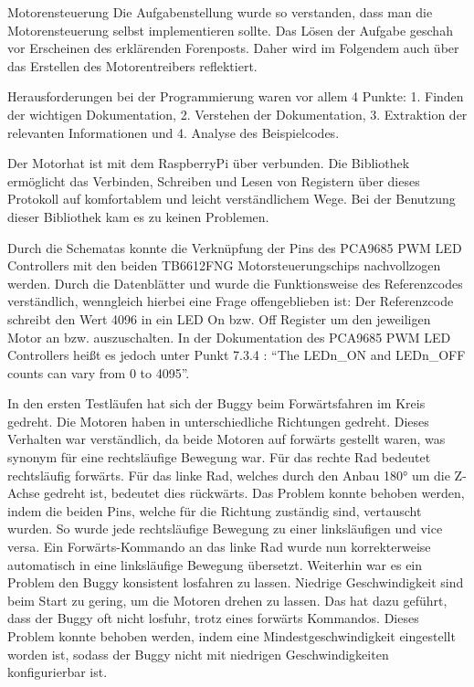 \documentclass[12pt]{report}
\begin{document}
\begin{section}{Motorensteuerung}
  Die Aufgabenstellung wurde so verstanden, dass man die Motorensteuerung
  selbst implementieren sollte. Das Lösen der Aufgabe geschah vor Erscheinen des
  erklärenden Forenposts. Daher wird im Folgendem auch über das Erstellen des
  Motorentreibers reflektiert.

  Herausforderungen bei der Programmierung waren vor allem 4 Punkte: 1. Finden der wichtigen
  Dokumentation, 2. Verstehen der Dokumentation, 3. Extraktion der relevanten
  Informationen und 4. Analyse des Beispielcodes.

  Der Motorhat ist mit dem RaspberryPi über \itoc{} verbunden. Die
  \wiringPi{} Bibliothek ermöglicht das Verbinden, Schreiben und Lesen von
  Registern über dieses Protokoll auf komfortablem und leicht verständlichem Wege.
  Bei der Benutzung dieser Bibliothek kam es zu keinen Problemen.
  
  Durch die Schematas \cite{motorhatDownloads}
  konnte die Verknüpfung der Pins des PCA9685 PWM LED Controllers mit den beiden
  TB6612FNG Motorsteuerungschips nachvollzogen werden.
  Durch die Datenblätter \cite{datasheetPCA9685} und \cite{datasheetTB6612}
  wurde die Funktionsweise des Referenzcodes \cite{referenzcode}
  verständlich, wenngleich hierbei eine Frage offengeblieben ist:
  Der Referenzcode schreibt den Wert 4096 in ein LED On bzw. Off Register um den
  jeweiligen Motor an bzw. auszuschalten. In der Dokumentation des PCA9685 PWM LED
  Controllers heißt es jedoch unter Punkt 7.3.4 : "`The LEDn\_ON and LEDn\_OFF
  counts can vary from 0 to 4095"'.

  In den ersten Testläufen hat sich der Buggy beim Forwärtsfahren im Kreis
  gedreht. Die Motoren haben in unterschiedliche Richtungen gedreht. Dieses
  Verhalten war verständlich, da beide Motoren auf forwärts gestellt waren, was
  synonym für eine rechtsläufige Bewegung war. Für das rechte Rad bedeutet
  rechtsläufig forwärts. Für das linke Rad, welches durch den Anbau 
  \ang{180} um die Z-Achse gedreht ist, bedeutet dies rückwärts.
  Das Problem konnte behoben werden, indem die beiden Pins, welche für die Richtung
  zuständig sind, vertauscht wurden. So wurde jede rechtsläufige Bewegung zu einer
  linksläufigen und vice versa. Ein Forwärts-Kommando an das linke Rad wurde nun
  korrekterweise automatisch in eine linksläufige Bewegung übersetzt.
  Weiterhin war es ein Problem den Buggy konsistent losfahren zu lassen. Niedrige 
  Geschwindigkeit sind beim Start zu gering, um die Motoren drehen zu
  lassen. Das hat dazu geführt, dass der Buggy oft nicht losfuhr, trotz eines
  forwärts Kommandos. Dieses Problem konnte behoben werden, indem eine Mindestgeschwindigkeit
  eingestellt worden ist, sodass der Buggy nicht mit niedrigen Geschwindigkeiten
  konfigurierbar ist.


\end{section}
\end{document}
